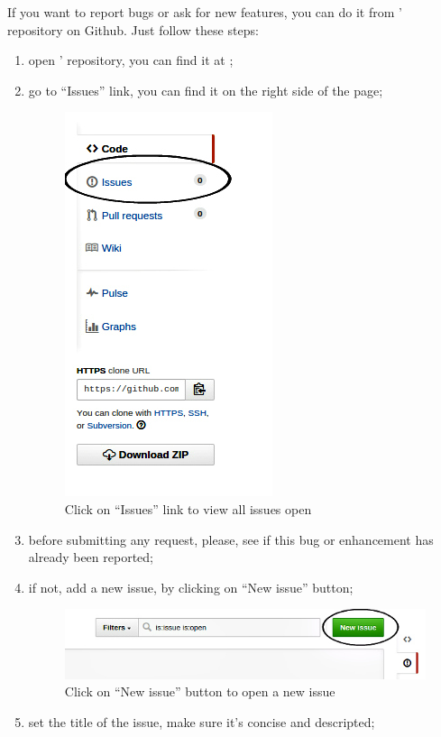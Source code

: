 If you want to report bugs or ask for new features, you can do it from ' repository on Github. Just follow these steps:
\begin{enumerate}
	\item open ' repository, you can find it at \insuri{};
	\item go to “Issues” link, you can find it on the right side of the page;
	\begin{figure}[H]
		\centering
		\includegraphics[scale=0.6]{Pics/Issues.jpg}
		\caption{Click on “Issues” link to view all issues open}
	\end{figure}
	\item before submitting any request, please, see if this bug or enhancement has already been reported;
	\item if not, add a new issue, by clicking on “New issue” button;
	\begin{figure}[H]
		\centering
		\includegraphics[scale=0.6]{Pics/NewIssue.jpg}
		\caption{Click on “New issue” button to open a new issue}
	\end{figure}
	\item set the title of the issue, make sure it's concise and descripted;

\end{enumerate}
